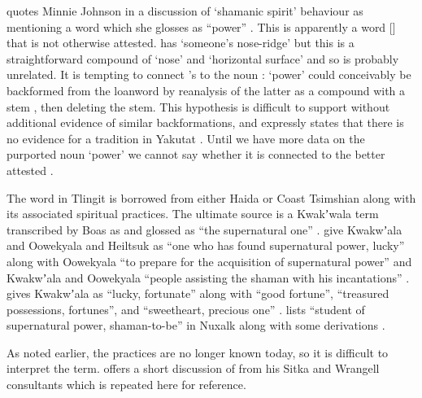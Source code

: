 \citeauthor{de-laguna:1972} quotes  Minnie Johnson in a discussion of  ‘shamanic spirit’ behaviour as mentioning a word  which she glosses as “power” \parencite[704 col.\ 1 para.\ 2]{de-laguna:1972}.
This is apparently a word  [] that is not otherwise attested.
\citeauthor{leer:1973} has  ‘someone’s nose-ridge’ \parencite[f06/5]{leer:1973} but this is a straightforward compound of  ‘nose’ and  ‘horizontal surface’ and so is probably unrelated.
It is tempting to connect \citeauthor{de-laguna:1972}’s  to the noun :  ‘power’ could conceivably be backformed from the loanword  by reanalysis of the latter as a compound  with a stem , then deleting the stem.
This hypothesis is difficult to support without additional evidence of similar backformations, and \citeauthor{de-laguna:1972} expressly states that there is no evidence for a  tradition in Yakutat \parencite[628]{de-laguna:1972}.
Until we have more data on the purported noun  ‘power’ we cannot say whether it is connected to the better attested .

The word  in Tlingit is borrowed from either Haida or Coast Tsimshian along with its associated spiritual practices.
The ultimate source is a Kwakʼwala term transcribed by Boas as  and glossed as “the supernatural one” \parencite[693 line 1]{boas-hunt:1897}.
\citeauthor{lincoln-rath:1980} give Kwakwʼala and Oowekyala  and Heiltsuk  as “one who has found supernatural power, lucky” along with Oowekyala  “to prepare for the acquisition of supernatural power” and Kwakwʼala and Oowekyala  “people assisting the shaman with his incantations” \parencite[180]{lincoln-rath:1980}. \citeauthor{grubb:1977} gives Kwakwʼala  as “lucky, fortunate” along with  “good fortune”,  “treasured possessions, fortunes”, and  “sweetheart, precious one” \parencite[165]{grubb:1977}.
\citeauthor{nater:1990} lists  “student of supernatural power, shaman-to-be” in Nuxalk along with some derivations \parencite[64]{nater:1990}.

As noted earlier, the  practices are no longer known today, so it is difficult to interpret the term.
\textcite{swanton:1908} offers a short discussion of  from his Sitka and Wrangell consultants which is repeated here for reference.

